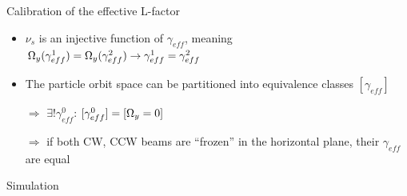 \documentclass[14pt]{beamer}
\newcommand{\gef}{\gamma_{eff}}
\begin{document}
\begin{frame}{Calibration of the effective L-factor}
	\begin{itemize}[<+->]
	\item $\nu_s$ is an injective function of $\gef$, meaning $\W_y(\gef^1) = \W_y(\gef^2) \to \gef^1=\gef^2$
	\item The particle orbit space can be partitioned into equivalence classes $[\gef]$
	\item[$\Rightarrow$] $\exists!\gef^0$: $[\gef^0] = [\W_y=0]$
	\item[$\Rightarrow$] if both CW, CCW beams are ``frozen'' in the horizontal plane, their $\gef$ are equal
	\end{itemize}
\end{frame}
\begin{frame}{Simulation}
\end{frame}
\end{document}
